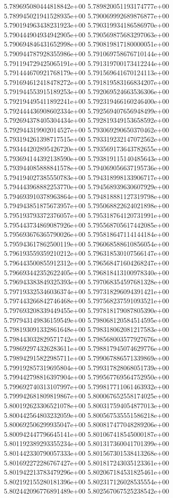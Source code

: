 5.789695080444818842e+00
5.789820051193174777e+00
5.789945021941528935e+00
5.790069992689876877e+00
5.790194963438231923e+00
5.790319934186586970e+00
5.790444904934942905e+00
5.790569875683297063e+00
5.790694846431652998e+00
5.790819817180000051e+00
5.790944787928355986e+00
5.791069758676710144e+00
5.791194729425065191e+00
5.791319700173412244e+00
5.791444670921768179e+00
5.791569641670124113e+00
5.791694612418478272e+00
5.791819583166834207e+00
5.791944553915189253e+00
5.792069524663536306e+00
5.792194495411892241e+00
5.792319466160246400e+00
5.792444436908602334e+00
5.792569407656948499e+00
5.792694378405304434e+00
5.792819349153658592e+00
5.792944319902014527e+00
5.793069290650370462e+00
5.793194261398717515e+00
5.793319232147072562e+00
5.793444202895426720e+00
5.793569173643782655e+00
5.793694144392138590e+00
5.793819115140485643e+00
5.793944085888841578e+00
5.794069056637195736e+00
5.794194027385550783e+00
5.794318998133906717e+00
5.794443968882253770e+00
5.794568939630607929e+00
5.794693910378963864e+00
5.794818881127319798e+00
5.794943851875673957e+00
5.795068822624021898e+00
5.795193793372376057e+00
5.795318764120731991e+00
5.795443734869087926e+00
5.795568705617442085e+00
5.795693676365790026e+00
5.795818647114144184e+00
5.795943617862500119e+00
5.796068588610856054e+00
5.796193559359210212e+00
5.796318530107566147e+00
5.796443500855912312e+00
5.796568471604268247e+00
5.796693442352622405e+00
5.796818413100978340e+00
5.796943383849325393e+00
5.797068354597681328e+00
5.797193325346036374e+00
5.797318296094391421e+00
5.797443266842746468e+00
5.797568237591093521e+00
5.797693208339449455e+00
5.797818179087805390e+00
5.797943149836159549e+00
5.798068120584514595e+00
5.798193091332861648e+00
5.798318062081217583e+00
5.798443032829571742e+00
5.798568003577927676e+00
5.798692974326283611e+00
5.798817945074629776e+00
5.798942915822985711e+00
5.799067886571339869e+00
5.799192857319695804e+00
5.799317828068051739e+00
5.799442798816397904e+00
5.799567769564752950e+00
5.799692740313107997e+00
5.799817711061463932e+00
5.799942681809819867e+00
5.800067652558174025e+00
5.800192623306521078e+00
5.800317594054877013e+00
5.800442564803232059e+00
5.800567535551586218e+00
5.800692506299935047e+00
5.800817477048289206e+00
5.800942447796645141e+00
5.801067418545000187e+00
5.801192389293355234e+00
5.801317360041701399e+00
5.801442330790057333e+00
5.801567301538413268e+00
5.801692272286767427e+00
5.801817243035123361e+00
5.801942213783479296e+00
5.802067184531825461e+00
5.802192155280181396e+00
5.802317126028535554e+00
5.802442096776891489e+00
5.802567067525238542e+00
